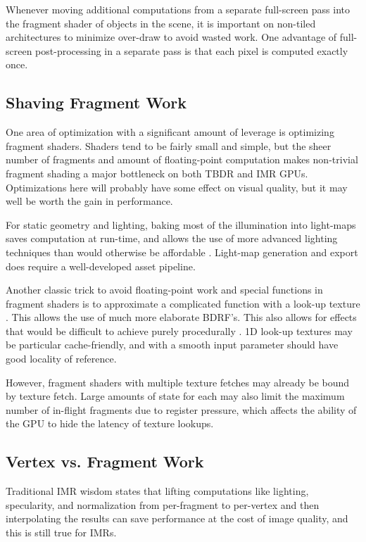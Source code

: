 Whenever moving additional computations from a separate full-screen pass into
the fragment shader of objects in the scene, it is important on non-tiled
architectures to minimize over-draw to avoid wasted work.  One advantage of
full-screen post-processing in a separate pass is that each pixel is computed
exactly once.

\subsection{Shaving Fragment Work}
\label{Jon-McCaffrey-Shaving-Fragment-Work}

One area of optimization with a significant amount of leverage is optimizing
fragment shaders.  Shaders tend to be fairly small and simple, but the sheer
number of fragments and amount of floating-point computation makes non-trivial
fragment shading a major bottleneck on both TBDR and IMR GPUs.  Optimizations
here will probably have some effect on visual quality, but it may well be worth
the gain in performance.

For static geometry and lighting, baking most of the illumination into
light-maps saves computation at run-time, and allows the use of more advanced
lighting techniques than would otherwise be affordable \cite{Miller99}
\cite{Unity11}.  Light-map generation and export does require a well-developed
asset pipeline.

Another classic trick to avoid floating-point work and special functions in
fragment shaders is to approximate a complicated function with a look-up
texture \cite{Pranckevicius11b}.  This allows the use of much more elaborate
BDRF's.  This also allows for effects that would be difficult to achieve purely
procedurally \cite{Mitchell07}.  1D look-up textures may be particular
cache-friendly, and with a smooth input parameter should have good locality of
reference.  

However, fragment shaders with multiple texture fetches may already be bound by
texture fetch.  Large amounts of state for each may also limit the maximum
number of in-flight fragments due to register pressure, which affects the
ability of the GPU to hide the latency of texture lookups.

\subsection{Vertex vs. Fragment Work}
\label{Jon-McCaffrey-Vertex-vs-Fragment-Work}

Traditional IMR wisdom states that lifting computations like lighting,
specularity, and normalization from per-fragment to per-vertex and then
interpolating the results can save performance at the cost of image quality,
and this is still true for IMRs.

